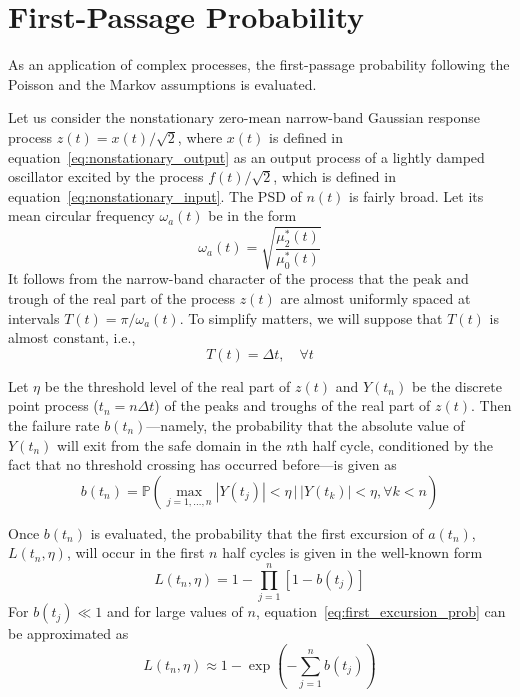 \documentclass[12pt]{article}
\begin{document}
\section{First-Passage Probability}
As an application of complex processes, the first-passage probability following the Poisson and the Markov assumptions is evaluated.

Let us consider the nonstationary zero-mean narrow-band Gaussian response process $z(t) = x(t)/\sqrt{2}$, where $x(t)$ is defined in equation~\eqref{eq:nonstationary_output} as an output process of a lightly damped oscillator excited by the process $f(t)/\sqrt{2}$, which is defined in equation~\eqref{eq:nonstationary_input}. The PSD of $n(t)$ is fairly broad. Let its mean circular frequency $\omega_a(t)$ be in the form
\begin{equation}
    \omega_a(t) = \sqrt{\frac{\mu_2^*(t)}{\mu_0^*(t)}}
    \label{eq:mean_circ_freq}
\end{equation}
It follows from the narrow-band character of the process that the peak and trough of the real part of the process $z(t)$ are almost uniformly spaced at intervals $T(t) = \pi/\omega_a(t)$. To simplify matters, we will suppose that $T(t)$ is almost constant, i.e.,
\begin{equation}
    T(t) = \Delta t, \quad \forall t
    \label{eq:interval_const}
\end{equation}

Let $\eta$ be the threshold level of the real part of $z(t)$ and $Y(t_n)$ be the discrete point process ($t_n = n\Delta t$) of the peaks and troughs of the real part of $z(t)$. Then the failure rate $b(t_n)$---namely, the probability that the absolute value of $Y(t_n)$ will exit from the safe domain in the $n$th half cycle, conditioned by the fact that no threshold crossing has occurred before---is given as
\begin{equation}
    b(t_n) = \mathbb{P} \left( \max_{j=1,\ldots,n} |Y(t_j)| < \eta \,\Big|\, |Y(t_k)| < \eta, \forall k < n \right)
    \label{eq:failure_rate}
\end{equation}

Once $b(t_n)$ is evaluated, the probability that the first excursion of $a(t_n)$, $L(t_n, \eta)$, will occur in the first $n$ half cycles is given in the well-known form~\cite{krenk1979, naess1983, naess1984, preumont1985, yang1971}
\begin{equation}
    L(t_n, \eta) = 1 - \prod_{j=1}^n [1 - b(t_j)]
    \label{eq:first_excursion_prob}
\end{equation}
For $b(t_j) \ll 1$ and for large values of $n$, equation~\eqref{eq:first_excursion_prob} can be approximated as~\cite{yang1971}
\begin{equation}
    L(t_n, \eta) \approx 1 - \exp \left( -\sum_{j=1}^n b(t_j) \right)
    \label{eq:first_excursion_approx}
\end{equation}
\end{document}
